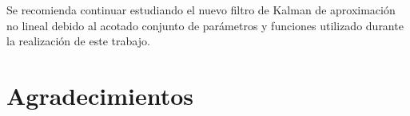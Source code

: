 \begin{preface}
Se recomienda continuar estudiando el nuevo filtro de Kalman de aproximaci\'on no lineal debido al acotado conjunto de par\'ametros y funciones utilizado durante la realizaci\'on de este trabajo.



\section{Agradecimientos}

\begin{flushright}
\makeatletter
	\@author
\makeatother
\end{flushright}

\tableofcontents

\listoftables

\listoffigures

\end{preface}